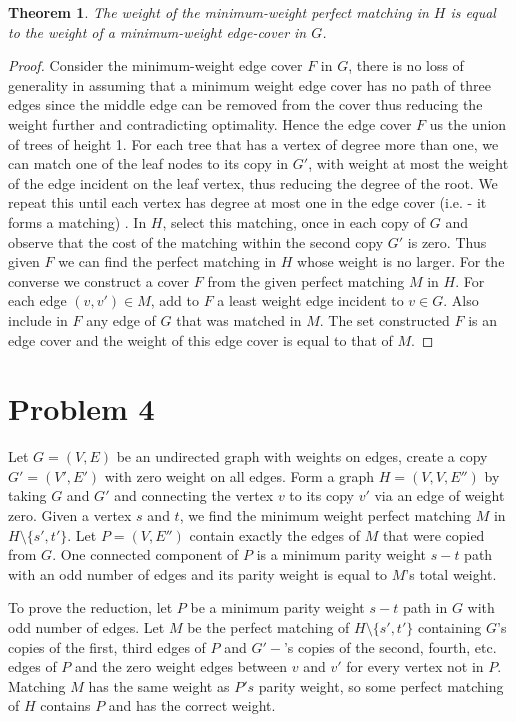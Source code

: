 \documentclass{article}
\numberwithin{equation}{section}
\newtheorem{theorem}{Theorem}
\begin{document}
\begin{theorem}
    The weight of the minimum-weight perfect matching in $H$ is equal to the weight of a minimum-weight edge-cover in $G$. 
\end{theorem}
\begin{proof}
    Consider the minimum-weight edge cover $F$ in $G$, there is no loss of generality in assuming that a minimum weight edge cover has no path of three edges since the middle edge can be removed from the cover thus reducing the weight further and contradicting optimality. Hence the edge cover $F$ us the union of trees of height 1. For each tree that has a vertex of degree more than one, we can match one of the leaf nodes to its copy in $G'$, with weight at most the weight of the edge incident on the leaf vertex, thus reducing the degree of the root. We repeat this until each vertex has degree at most one in the edge cover (i.e. - it forms a matching) . In $H$, select this matching, once in each copy of $G$ and observe that the cost of the matching within the second copy $G'$ is zero. Thus given $F$ we can find the perfect matching in $H$ whose weight is no larger. For the converse we construct a cover $F$ from the given perfect matching $M$ in $H$. For each edge $(v, v')\in M$, add to $F$ a least weight edge incident to $v \in G$. Also include in $F$ any edge of $G$ that was matched in $M$. The set constructed $F$ is an edge cover and the weight of this edge cover is equal to that of $M$. 
\end{proof}
\newpage
\section{Problem 4}
Let $G=(V, E)$ be an undirected graph with weights on edges, create a copy $G'=(V', E')$ with zero weight on all edges. Form a graph $H=(V, V, E'')$ by taking $G$ and $G'$ and connecting the vertex $v$ to its copy $v'$ via an edge of weight zero. Given a vertex $s$ and $t$, we find the minimum weight perfect matching $M$ in $H\setminus\{s', t'\}$. Let $P=(V, E'')$ contain exactly the edges of $M$ that were copied from $G$. One connected component of $P$ is a minimum parity weight $s-t$ path with an odd number of edges and its parity weight is equal to $M$'s total weight.  

To prove the reduction, let $P$ be a minimum parity weight $s-t$ path in $G$ with odd number of edges. Let $M$ be the perfect matching of $H\setminus\{s', t'\}$ containing $G$'s copies of the first, third edges of $P$ and $G'-$'s copies of the second, fourth, etc. edges of $P$ and the zero weight edges between $v$ and $v'$ for every vertex not in $P$. Matching $M$ has the same weight as $P's$ parity weight, so some perfect matching of $H$ contains $P$ and has the correct weight. 
\end{document}
